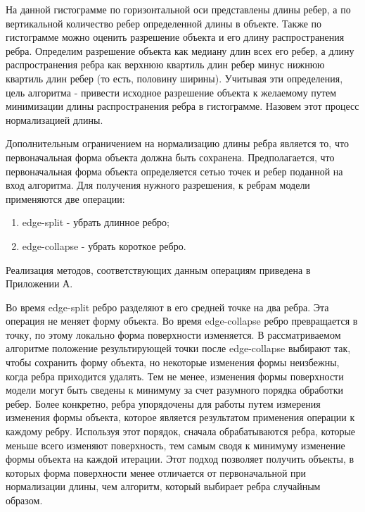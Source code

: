 \documentclass[14pt]{article}
\numberwithin{figure}{section}
\numberwithin{equation}{section}
\begin{document}
На данной гистограмме по горизонтальной оси представлены длины ребер, а по вертикальной количество ребер определенной длины в объекте. Также по гистограмме можно оценить разрешение объекта и его длину распространения ребра. Определим разрешение объекта как медиану длин всех его ребер, а длину распространения ребра как верхнюю квартиль длин ребер минус нижнюю квартиль длин ребер (то есть, половину ширины). Учитывая эти определения, цель алгоритма - привести исходное разрешение объекта к желаемому путем минимизации длины распространения ребра в гистограмме. Назовем этот процесс нормализацией длины.

Дополнительным ограничением на нормализацию длины ребра является то, что первоначальная форма объекта должна быть сохранена. Предполагается, что первоначальная форма объекта определяется сетью точек и ребер поданной на вход алгоритма. Для получения нужного разрешения, к ребрам модели применяются две операции:

\begin{enumerate}
	\item
	edge-split - убрать длинное ребро;
	\item
	edge-collapse - убрать короткое ребро.
\end{enumerate}

Реализация методов, соответствующих данным операциям приведена в Приложении А.

Во время edge-split ребро разделяют в его средней точке на два ребра. Эта операция не меняет форму объекта. Во время edge-collapse ребро превращается в точку, по этому локально форма поверхности изменяется. В рассматриваемом алгоритме положение результирующей точки после edge-collapse выбирают так, чтобы сохранить форму объекта, но некоторые изменения формы неизбежны, когда ребра приходится удалять. Тем не менее, изменения формы поверхности модели могут быть сведены к минимуму за счет разумного порядка обработки ребер. Более конкретно, ребра упорядочены для работы путем измерения изменения формы объекта, которое является результатом применения операции к каждому ребру. Используя этот порядок, сначала обрабатываются ребра, которые меньше всего изменяют поверхность, тем самым сводя к минимуму изменение формы объекта на каждой итерации. Этот подход позволяет получить объекты, в которых форма поверхности менее отличается от первоначальной при нормализации длины, чем алгоритм, который выбирает ребра случайным образом.

\end{document}
